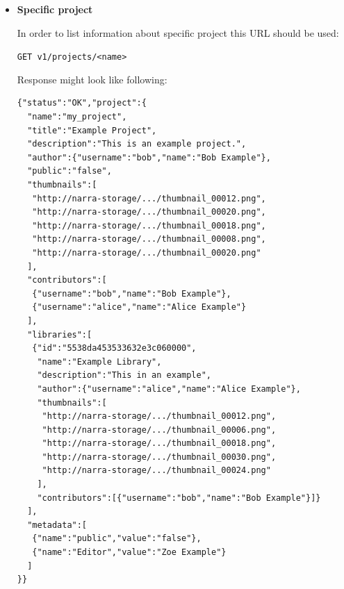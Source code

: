 \documentclass[thesis=B,english]{FITthesis}[2012/10/20]
\begin{document}
\begin{itemize}
\texttt{GET v1/projects}

Response might look like following:
\begin{verbatim}
{"status":"OK","projects":[
  {"name":"my_project",
   "title":"Example Project",
   "description":"This is an example project.",
   "author":{"username":"bob","name":"Bob Example"},
   "public":"false",
   "thumbnails":[
    "http://narra-storage/.../thumbnail_00012.png",
    "http://narra-storage/.../thumbnail_00020.png",
    "http://narra-storage/.../thumbnail_00018.png",
    "http://narra-storage/.../thumbnail_00008.png",
    "http://narra-storage/.../thumbnail_00020.png"
   ],
   "contributors":[
    {"username":"bob","name":"Bob Example"},
    {"username":"alice","name":"Alice Example"}
   ]},
  {"name":"another",
   "title":"Another Example",
   "description":"This is yet another example project.",
   "author":{"username":"bob","name":"Bob Example"},
   "public":"false",
   "thumbnails":[
    "http://narra-storage/.../thumbnail_00012.png",
    "http://narra-storage/.../thumbnail_00020.png",
    "http://narra-storage/.../thumbnail_00018.png",
    "http://narra-storage/.../thumbnail_00008.png",
    "http://narra-storage/.../thumbnail_00020.png"
   ],
   "contributors":[]}
]}
\end{verbatim}

		\item \textbf{Specific project}

In order to list information about specific project this URL should be used:

\texttt{GET v1/projects/<name>}

Response might look like following:
\begin{verbatim}
{"status":"OK","project":{
  "name":"my_project",
  "title":"Example Project",
  "description":"This is an example project.",
  "author":{"username":"bob","name":"Bob Example"},
  "public":"false",
  "thumbnails":[
   "http://narra-storage/.../thumbnail_00012.png",
   "http://narra-storage/.../thumbnail_00020.png",
   "http://narra-storage/.../thumbnail_00018.png",
   "http://narra-storage/.../thumbnail_00008.png",
   "http://narra-storage/.../thumbnail_00020.png"
  ],
  "contributors":[
   {"username":"bob","name":"Bob Example"},
   {"username":"alice","name":"Alice Example"}
  ],
  "libraries":[
   {"id":"5538da453533632e3c060000",
    "name":"Example Library",
    "description":"This in an example",
    "author":{"username":"alice","name":"Alice Example"},
    "thumbnails":[
     "http://narra-storage/.../thumbnail_00012.png",
     "http://narra-storage/.../thumbnail_00006.png",
     "http://narra-storage/.../thumbnail_00018.png",
     "http://narra-storage/.../thumbnail_00030.png",
     "http://narra-storage/.../thumbnail_00024.png"
    ],
    "contributors":[{"username":"bob","name":"Bob Example"}]}
  ],
  "metadata":[
   {"name":"public","value":"false"},
   {"name":"Editor","value":"Zoe Example"}
  ]
}}
\end{verbatim}


\end{itemize}
\end{document}
